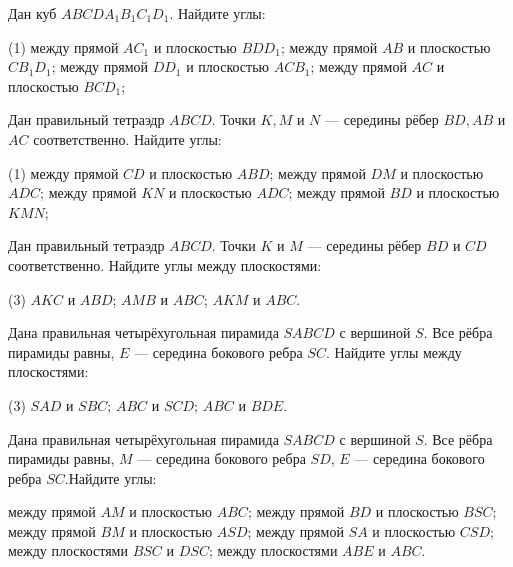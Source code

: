 \begin{class}[number=2]
	\begin{listofex}
		\item Дан куб \(ABCDA_1B_1C_1D_1\). Найдите углы:
		\begin{tasks}(1)
			\task между прямой \( AC_1 \) и плоскостью \(BDD_1 \);
			\task между прямой \(  AB\) и плоскостью \( CB_1D_1\);
			\task между прямой \( DD_1 \) и плоскостью \( ACB_1\);
			\task между прямой \( AC \) и плоскостью \( BCD_1\);
		\end{tasks}
		\item Дан правильный тетраэдр \(ABCD\). Точки \(K, M\) и \(N\) --- середины рёбер \(BD, AB\) и \(AC\) соответственно. Найдите углы:
		\begin{tasks}(1)
			\task между прямой \( CD \) и плоскостью \(ABD \);
			\task между прямой \(  DM\) и плоскостью \( ADC \);
			\task между прямой \( KN \) и плоскостью \( ADC\);
			\task между прямой \( BD \) и плоскостью \( KMN\);
		\end{tasks}
		\item Дан правильный тетраэдр \(ABCD\). Точки \(K\) и \(M\) --- середины рёбер \(BD\) и \(CD\) соответственно. Найдите углы между плоскостями:
		\begin{tasks}(3)
			\task \( AKC \) и \( ABD \);
			\task \( AMB \) и \( ABC \);
			\task \( AKM \) и \( ABC \).
		\end{tasks}
		\item Дана правильная четырёхугольная пирамида \(SABCD\) с вершиной \(S\). Все рёбра пирамиды равны, \(E\) --- середина бокового ребра \(SC\). Найдите углы между плоскостями:
		\begin{tasks}(3)
			\task \( SAD \) и \( SBC \);
			\task \( ABC \) и \( SCD \);
			\task \( ABC \) и \( BDE \).
		\end{tasks}
	\end{listofex}
\end{class}

\begin{homework}[number=1]
	\begin{listofex}
		\item Дана правильная четырёхугольная пирамида \(SABCD\) с вершиной \(S\). Все рёбра пирамиды равны, \(M\) --- середина бокового ребра \(SD\), \(E\) --- середина бокового ребра \(SC\).Найдите углы:
		\begin{tasks}
			\task между прямой \(AM\) и плоскостью \(ABC\);
			\task между прямой \(BD\) и плоскостью \(BSC\);
			\task между прямой \(BM\) и плоскостью \(ASD\);
			\task между прямой \(SA\) и плоскостью \(CSD\);
			\task между плоскостями \( BSC \) и \( DSC \);
			\task между плоскостями \( ABE \) и \( ABC \).
		\end{tasks}
	\end{listofex}
\end{homework}

